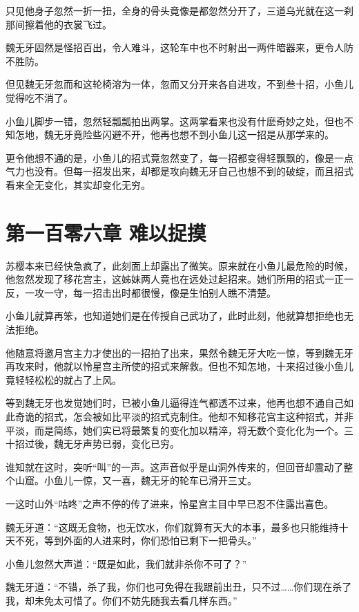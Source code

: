 \documentclass[12pt,oneside]{book}
\begin{document}
只见他身子忽然一折一扭，全身的骨头竟像是都忽然分开了，三道乌光就在这一刹那间擦着他的衣裳飞过。

魏无牙固然是怪招百出，令人难斗，这轮车中也不时射出一两件暗器来，更令人防不胜防。

但见魏无牙忽而和这轮椅溶为一体，忽而又分开来各自进攻，不到叁十招，小鱼儿觉得吃不消了。

小鱼儿脚步一错，忽然轻瓢瓢拍出两掌。这两掌看来也没有什麽奇妙之处，但也不知怎地，魏无牙竟险些闪避不开，他再也想不到小鱼儿这一招是从那学来的。

更令他想不通的是，小鱼儿的招式竟忽然变了，每一招都变得轻飘飘的，像是一点气力也没有。但每一招发出来，却都是攻向魏无牙自己也想不到的破绽，而且招式看来全无变化，其实却变化无穷。

\hypertarget{ux7b2cux4e00ux767eux96f6ux516dux7ae0-ux96beux4ee5ux6349ux6478}{%
\chapter{第一百零六章
难以捉摸}\label{ux7b2cux4e00ux767eux96f6ux516dux7ae0-ux96beux4ee5ux6349ux6478}}

苏樱本来已经快急疯了，此刻面上却露出了微笑。原来就在小鱼儿最危险的时候，他忽然发现了移花宫主，这姊妹两人竟也在远处过起招来。她们所用的招式一正一反，一攻一守，每一招击出时都很慢，像是生怕别人瞧不清楚。

小鱼儿就算再笨，也知道她们是在传授自己武功了，此时此刻，他就算想拒绝也无法拒绝。

他随意将邀月宫主力才使出的一招拍了出来，果然令魏无牙大吃一惊，等到魏无牙再攻来时，他就以怜星宫主所使的招式来解救。但也不知怎地，十来招过後小鱼儿竟轻轻松松的就占了上风。

等到魏无牙也发觉她们时，已被小鱼儿逼得连气都透不过来，他再也想不通自己如此奇诡的招式，怎会被如比平淡的招式克制住。他却不知移花宫主这种招式，并非平淡，而是简练，她们实已将最繁复的变化加以精淬，将无数个变化化为一个。三十招过後，魏无牙声势已弱，变化已穷。

谁知就在这时，突听``叫''的一声。这声音似乎是山洞外传来的，但回音却震动了整个山窟。小鱼儿一惊，又一喜，魏无牙的轮车已滑开三丈。

一这时山外``咕咚''之声不停的传了进来，怜星宫主目中早已忍不住露出喜色。

魏无牙道：``这既无食物，也无饮水，你们就算有天大的本事，最多也只能维持十天不死，等到外面的人进来时，你们恐怕已剩下一把骨头。''

小鱼儿忽然大声道：``既是如此，我们就非杀你不可了？''

魏无牙道：``不错，杀了我，你们也可免得在我跟前出丑，只不过\ldots\ldots 你们现在杀了我，却未免太可惜了。你们不妨先随我去看几样东西。''
\end{document}
